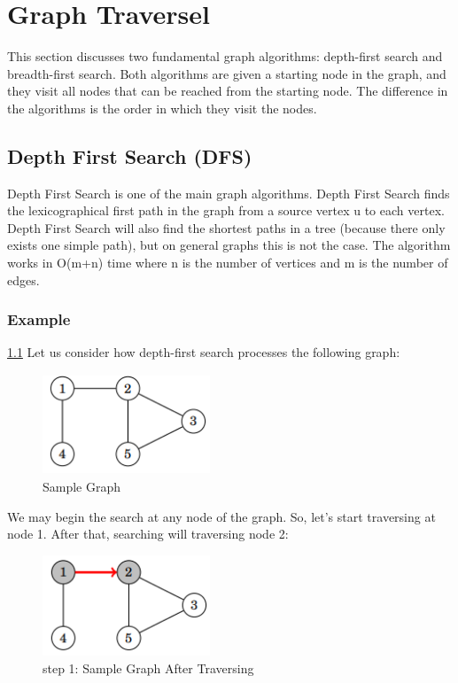 \newpage
\section{Graph Traversel}
This section discusses two fundamental graph algorithms: depth-first search and breadth-first search. Both algorithms are given a starting node in the graph, and they visit all nodes that can be reached from the starting node. The difference in the algorithms is the order in which they visit the nodes.
\subsection{Depth First Search (DFS) }\label{subsection:DFS}
Depth First Search is one of the main graph algorithms. Depth First Search finds the lexicographical first path in the graph from a source vertex u to each vertex. Depth First Search will also find the shortest paths in a tree (because there only exists one simple path), but on general graphs this is not the case. The algorithm works in O(m+n) time where n is the number of vertices and m is the number of edges.

\subsubsection{Example}\ref{subsection:DFS}
Let us consider how depth-first search processes the following graph:

\begin{figure}[h]
    \centering
\includegraphics[width=5cm, height=3cm]{graph-example.png}
 \caption{Sample Graph}
    \label{fig:graph-example}
\end{figure}

We may begin the search at any node of the graph. So, let's start traversing at node 1. After that, searching will traversing node 2:

\begin{figure}[h]
    \centering
\includegraphics[width=5cm, height=3cm]{graph-example-traverse-1.png}
 \caption{step 1: Sample Graph After Traversing}
    \label{fig:graph-example-traverse-1}
\end{figure}

